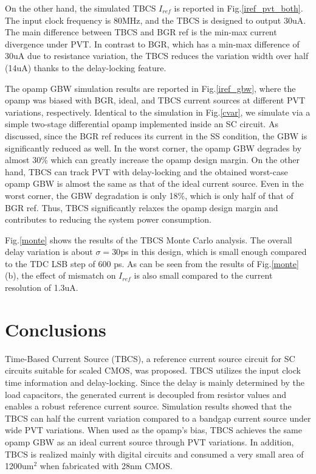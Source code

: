 \documentclass[paper]{ieice}
\begin{document}
On the other hand, the simulated TBCS $I_{ref}$ is reported in Fig.\ref{iref_pvt_both}. The input clock frequency is 80MHz, and the TBCS is designed to output 30uA. The main difference between TBCS and BGR ref is the min-max current divergence under PVT. In contrast to BGR, which has a min-max difference of 30uA due to resistance variation, the TBCS reduces the variation width over half (14uA) thanks to the delay-locking feature.

The opamp GBW simulation results are reported in Fig.\ref{iref_gbw}, where the opamp was biased with BGR, ideal, and TBCS current sources at different PVT variations, respectively. Identical to the simulation in Fig.\ref{cvar}, we simulate via a simple two-stage differential opamp implemented inside an SC circuit.
As discussed, since the BGR ref reduces its current in the SS condition, the GBW is significantly reduced as well. In the worst corner, the opamp GBW degrades by almost 30\% which can greatly increase the opamp design margin.
On the other hand, TBCS can track PVT with delay-locking and the obtained worst-case opamp GBW is almost the same as that of the ideal current source. Even in the worst corner, the GBW degradation is only 18\%, which is only half of that of BGR ref. Thus, TBCS significantly relaxes the opamp design margin and contributes to reducing the system power consumption.

Fig.\ref{monte} shows the results of the TBCS Monte Carlo analysis. The overall delay variation is about $\sigma= 30 $ps in this design, which is small enough compared to the TDC LSB step of 600 ps. As can be seen from the results of Fig.\ref{monte}(b), the effect of mismatch on $I_{ref}$ is also small compared to the current resolution of 1.3uA. %


\section{Conclusions}
\qquad Time-Based Current Source (TBCS), a reference current source circuit for SC circuits suitable for scaled CMOS, was proposed. TBCS utilizes the input clock time information and delay-locking. Since the delay is mainly determined by the load capacitors, the generated current is decoupled from resistor values and enables a robust reference current source.  Simulation results showed that the TBCS can half the current variation compared to a bandgap current source under wide PVT variations. When used as the opamp's bias, TBCS achieves the same opamp GBW as an ideal current source through PVT variations. In addition, TBCS is realized mainly with digital circuits and consumed a very small area of 1200um$^2$ when fabricated with 28nm CMOS.
\end{document}
